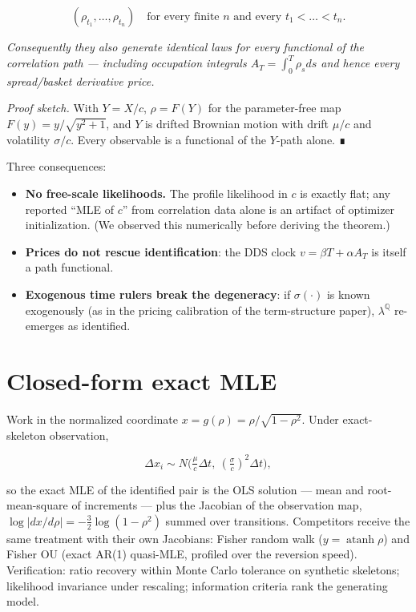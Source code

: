\documentclass[
  english,
  10pt,
  letterpaper,
  DIV=11,
  numbers=noendperiod]{scrartcl}
\providecommand{\tightlist}{%
  \setlength{\itemsep}{0pt}\setlength{\parskip}{0pt}}
\begin{document}
\[
(\rho_{t_1},\dots,\rho_{t_n})\quad\text{for every finite } n
\text{ and every } t_1<\dots<t_n .
\]

\emph{Consequently they also generate identical laws for every
functional of the correlation path --- including occupation integrals
\(A_T=\int_0^T\rho_sds\) and hence every spread/basket derivative
price.}

\emph{Proof sketch.} With \(Y=X/c\), \(\rho=F(Y)\) for the
parameter-free map \(F(y)=y/\sqrt{y^2+1}\), and \(Y\) is drifted
Brownian motion with drift \(\mu/c\) and volatility \(\sigma/c\). Every
observable is a functional of the \(Y\)-path alone. ∎

Three consequences:

\begin{itemize}
\tightlist
\item
  \textbf{No free-scale likelihoods.} The profile likelihood in \(c\) is
  exactly flat; any reported ``MLE of \(c\)'' from correlation data
  alone is an artifact of optimizer initialization. (We observed this
  numerically before deriving the theorem.)
\item
  \textbf{Prices do not rescue identification}: the DDS clock
  \(v=\beta T+\alpha A_T\) is itself a path functional.
\item
  \textbf{Exogenous time rulers break the degeneracy}: if
  \(\sigma(\cdot)\) is known exogenously (as in the pricing calibration
  of the term-structure paper), \(\lambda^{\mathbb Q}\) re-emerges as
  identified.
\end{itemize}

\section{Closed-form exact MLE}\label{sec-mle}

Work in the normalized coordinate \(x=g(\rho)=\rho/\sqrt{1-\rho^2}\).
Under exact-skeleton observation,

\[
\Delta x_i \sim N\!\Big(\tfrac{\mu}{c}\Delta t,\ (\tfrac{\sigma}{c})^2\Delta t\Big),
\]

so the exact MLE of the identified pair is the OLS solution --- mean and
root-mean-square of increments --- plus the Jacobian of the observation
map, \(\log|dx/d\rho|=-\tfrac{3}{2}\log(1-\rho^2)\) summed over
transitions. Competitors receive the same treatment with their own
Jacobians: Fisher random walk (\(y=\operatorname{atanh}\rho\)) and
Fisher OU (exact AR(1) quasi-MLE, profiled over the reversion speed).
Verification: ratio recovery within Monte Carlo tolerance on synthetic
skeletons; likelihood invariance under rescaling; information criteria
rank the generating model.
\end{document}
